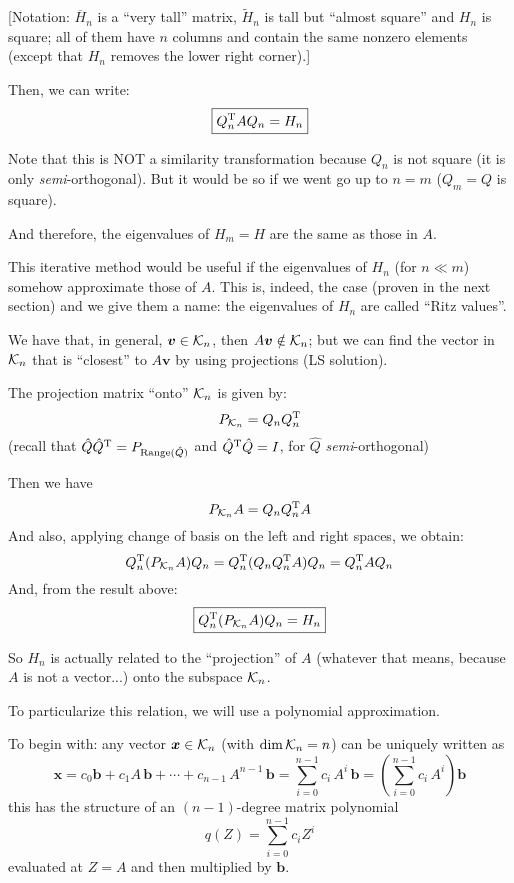 \documentclass[
  12pt,
  paper=a4,
]{scrartcl} %
\begin{document}
[Notation: $\overline{H}_n$ is a ``very tall'' matrix, $\tilde H_n$ is tall but ``almost square'' and $H_n$ is square; all of them have $n$ columns and contain the same nonzero elements (except that $H_n$ removes the lower right corner).]

Then, we can write:
\[
    \boxed{Q_n^{\mathrm{T}} AQ_n = H_{n}}
\]

Note that this is NOT a similarity transformation because $Q_n$ is not square (it is only \emph{semi}-orthogonal). But it would be so if we went go up to $n=m$ ($Q_m=Q$ is square).

And therefore, the eigenvalues of $H_m=H$ are the same as those in $A$.

This iterative method would be useful if the eigenvalues of $H_n$ (for $n\ll m$) somehow approximate those of $A$. This is, indeed, the case (proven in the next section) and we give them a name: the eigenvalues of $H_n$ are called ``Ritz values''.

We have that, in general, $\bm v\in\mathcal{K}_n$, then $A\bm v\notin\mathcal{K}_n$; but we can find the vector in $\mathcal{K}_n$ that is ``closest'' to $A\bm v$ by using projections (LS solution).

The projection matrix ``onto'' $\mathcal{K}_n$ is given by:
\[
    P_{\mathcal{K}_n} = Q_n Q_n^{\mathrm{T}}
\]
(recall that $\hat Q \hat Q^{\mathrm{T}}=P_{\operatorname{Range}(\hat Q)}$ and 
$\hat Q^{\mathrm{T}} \hat Q=I$, for $\hat Q$ \emph{semi}-orthogonal)

Then we have
\[
    P_{\mathcal{K}_n} A = Q_n Q_n^{\mathrm{T}} A
\]
And also, applying change of basis on the left and right spaces, we obtain:
\[
    Q_n^{\mathrm{T}} (P_{\mathcal{K}_n} A) Q_n =
    Q_n^{\mathrm{T}} (Q_n Q_n^{\mathrm{T}} A) Q_n = 
    Q_n^{\mathrm{T}} A Q_n
\]
And, from the result above:
\[
    \boxed{Q_n^{\mathrm{T}} (P_{\mathcal{K}_n} A) Q_n = H_n}
\]

So $H_n$ is actually related to the ``projection'' of $A$ (whatever that means, because $A$ is not a vector...) onto the subspace $\mathcal{K}_n$.

To particularize this relation, we will use a polynomial approximation.

To begin with: any vector $\bm x\in\mathcal{K}_n$ (with $\dim\mathcal{K}_n=n$) can be uniquely written as
\[
    \bm x = c_0 \bm b +
    c_1 A\,\bm b +
    \cdots +
    c_{n-1} \, A^{n-1} \,\bm b
    =
    \sum_{i=0}^{n-1} c_i \, A^{i} \,\bm b
    =
    \left(
    \sum_{i=0}^{n-1} c_i \, A^{i}\right) \bm b
\]
this has the structure of an $(n-1)$-degree matrix polynomial \[q(Z)=\sum_{i=0}^{n-1} c_i Z^i\]
evaluated at $Z=A$ and then multiplied by $\bm b$.
\end{document}
